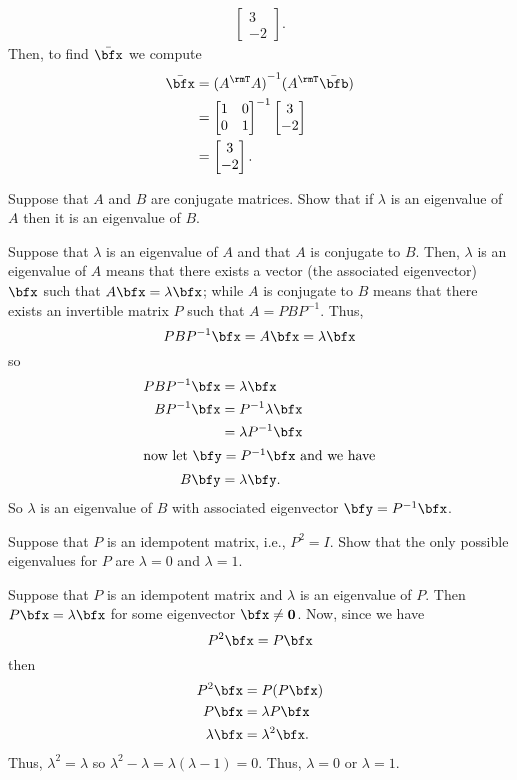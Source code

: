 \begin{questions}
\begin{solution}
\begin{align*}
\begin{bmatrix}
        3\\-2
        \end{bmatrix}.
    \end{align*}
    Then, to find $\bar\bfx$ we compute
    \begin{align*}
      \bar\bfx
      &={(A^\rmT A)}^{-1}(A^\rmT\bar\bfb)\\
      &=
      \begin{bmatrix}
        1&0\\
        0&1\\
      \end{bmatrix}^{-1}
      \begin{bmatrix}
        3\\-2
      \end{bmatrix}\\
      &=\begin{bmatrix}
        3\\-2
        \end{bmatrix}.
    \end{align*}
  \end{solution}
  \question[4] Suppose that $A$ and $B$ are conjugate matrices. Show that
  if $\lambda$ is an eigenvalue of $A$ then it is an eigenvalue of $B$.
  \begin{solution}
    Suppose that $\lambda$ is an eigenvalue of $A$ and that $A$ is
    conjugate to $B$. Then, $\lambda$ is an eigenvalue of $A$ means that
    there exists a vector (the associated eigenvector) $\bfx$ such that
    $A\bfx=\lambda\bfx$; while $A$ is conjugate to $B$ means that there
    exists an invertible matrix $P$ such that $A=PBP^{-1}$. Thus,
    \[
      PBP^{-1}\bfx=A\bfx=\lambda\bfx
    \]
    so
    \begin{align*}
      PBP^{-1}\bfx
      &=\lambda\bfx\\
      BP^{-1}\bfx&=P^{-1}\lambda\bfx\\
      &=\lambda P^{-1}\bfx\\
      \intertext{now let $\bfy=P^{-1}\bfx$ and we have}
      B\bfy&=\lambda\bfy.
    \end{align*}
    So $\lambda$ is an eigenvalue of $B$ with associated eigenvector
    $\bfy=P^{-1}\bfx$.
  \end{solution}
  \question[8] Suppose that $P$ is an idempotent matrix, i.e., $P^2=I$. Show
  that the only possible eigenvalues for $P$ are $\lambda=0$ and
  $\lambda=1$.
  \begin{solution}
    Suppose that $P$ is an idempotent matrix and $\lambda$ is an eigenvalue
    of $P$. Then $P\bfx=\lambda\bfx$ for some eigenvector $\bfx\neq
    \mathbf{0}$. Now, since we have
    \[
      P^2\bfx=P\bfx
    \]
    then
    \begin{align*}
      P^2\bfx&=P(P\bfx)\\
      P\bfx&=\lambda P\bfx\\
      \lambda\bfx&=\lambda^2\bfx.
    \end{align*}
    Thus, $\lambda^2=\lambda$ so
    $\lambda^2-\lambda=\lambda(\lambda-1)=0$. Thus, $\lambda=0$ or
    $\lambda=1$.
  \end{solution}
\end{questions}
